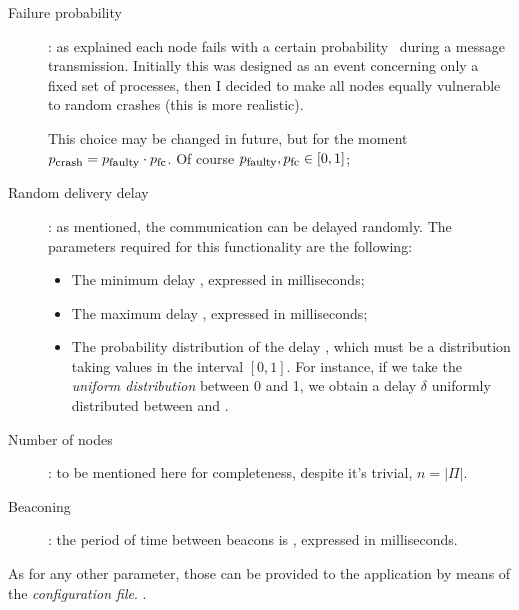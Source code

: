 \begin{description}

    \item[Failure probability]:
        as explained each node fails with a certain probability \PCrash\
        during a message transmission. Initially this was designed as an
        event concerning only a fixed set of processes, then I decided to
        make all nodes equally vulnerable to random crashes (this is more
        realistic).

        This choice may be changed in future, but for the moment
        ${p}_{\mbox{\footnotesize{crash}}} = {p}_{\mbox{\footnotesize{faulty}}} \cdot {p}_{\mbox{\footnotesize{fc}}}$. Of course
        ${p}_{\mbox{\footnotesize{faulty}}}, {p}_{\mbox{\footnotesize{fc}}} \in [0, 1]$;

    \item[Random delivery delay]:
        as mentioned, the communication can be delayed randomly. The
        parameters required for this functionality are the following:

        \begin{itemize}

        \item   The minimum delay , expressed in
                milliseconds;

        \item   The maximum delay , expressed
                in milliseconds;

        \item   The probability distribution of the delay
                , which must be a distribution taking
                values in the interval $[0, 1]$. For instance, if we take
                the \emph{uniform distribution} between 0 and 1, we obtain
                a delay $\delta$ uniformly distributed between
                 and .

        \end{itemize}

    \item[Number of nodes]:
        to be mentioned here for completeness, despite it's trivial, $n =
        \left|\Pi\right|$.

    \item[Beaconing]:
        the period of time between beacons is ,
        expressed in milliseconds.

\end{description}

As for any other parameter, those can be provided to the application by
means of the \emph{configuration file}.
.
